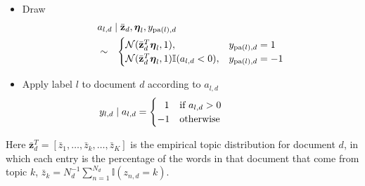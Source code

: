 \begin{shortbox}
\begin{enumerate}
\begin{itemize}
\begin{itemize}
\item Draw 
\begin{eqnarray}\lefteqn{a_{l,d}\mid \bar{\mathbf{z}}_d,\boldsymbol\eta_{l},y_{\mathrm{pa}(l),d}}\nonumber \\&\sim&\begin{cases}
\mathcal{N}(\bar{\mathbf{z}}^{T}_d\boldsymbol\eta_{l},1), & y_{\mathrm{pa}(l),d}=1 \\
\mathcal{N}(\bar{\mathbf{z}}^{T}_d\boldsymbol\eta_{l},1)\mathbb{I}(a_{l,d}<0), & y_{\mathrm{pa}(l),d}=-1 \end{cases}\label{zero_0}\end{eqnarray} %
 
\item Apply label $l$ to document $d$ according to $a_{l,d}$ \begin{eqnarray}\hspace{-2.2cm}
y_{l,d}\mid a_{l,d}=\begin{cases}
\;\;\, 1 & \text{if \ensuremath{a_{l,d}>0}}  \\%
 -1 & \text{otherwise} \end{cases}\label{zero_1}\end{eqnarray}
 
\end{itemize}
\end{itemize}
\end{enumerate}
\end{shortbox}

Here $\bar{\mathbf{z}}_d^T = [\bar{z}_{1}, \ldots, \bar{z}_k, \ldots, \bar{z}_K]$ is the empirical topic distribution for document $d$, in which each entry is the percentage of the words in that document that come from topic $k$, $\bar{z}_{k}=N_{d}^{-1}\sum_{n=1}^{N_d}\mathbb{I}(z_{n,d}=k).$ 

